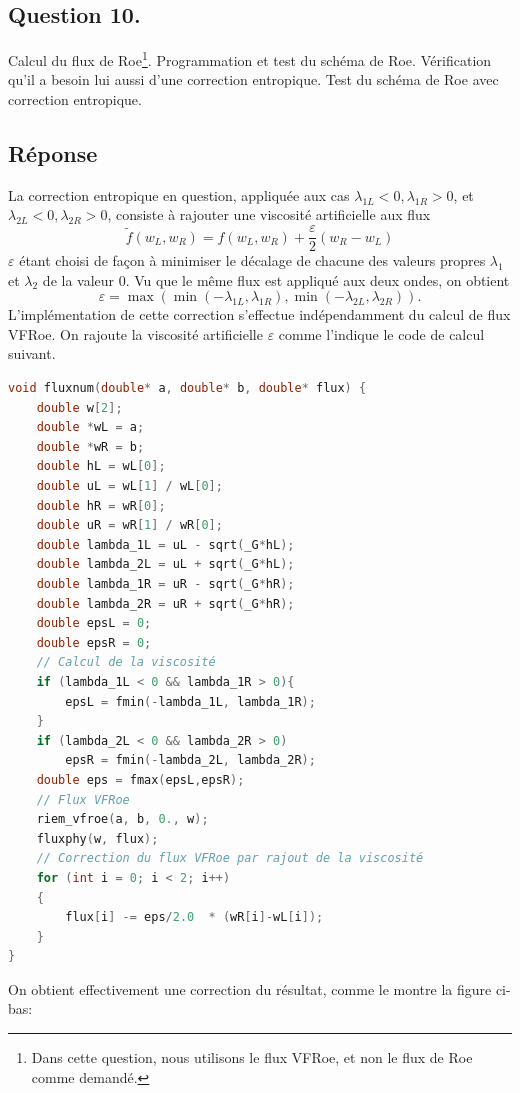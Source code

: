 \documentclass[
	french,
	11pt, %
]{fphw}
\begin{document}
\subsection*{Question 10.}
\begin{problem}
	Calcul du flux de Roe\footnote{Dans cette question, nous utilisons le flux VFRoe, et non le flux de Roe comme demandé.}. Programmation et test du schéma de Roe. Vérification qu'il a besoin lui aussi d'une correction entropique. Test du schéma de Roe avec correction entropique.
\end{problem}

\subsection*{Réponse} 

La correction entropique en question, appliquée aux cas $\lambda_{1L} < 0, \lambda_{1R} > 0$, et $\lambda_{2L} < 0, \lambda_{2R} > 0$, consiste à rajouter une viscosité artificielle aux flux 
$$
\tilde{f}(w_L,w_R) = f(w_L,w_R) + \frac{\varepsilon}{2} (w_R-w_L)
$$
$\varepsilon$ étant choisi de façon à minimiser le décalage de chacune des valeurs propres $\lambda_1$ et $\lambda_2$ de la valeur $0$. Vu que le même flux est appliqué aux deux ondes, on obtient 
$$
\varepsilon = \max{(\min{(-\lambda_{1L}, \lambda_{1R})}, \min{(-\lambda_{2L}, \lambda_{2R})})}.
$$ 
L'implémentation de cette correction s'effectue indépendamment du calcul de flux VFRoe. On rajoute la viscosité artificielle $\varepsilon$ comme l'indique le code de calcul suivant.


\begin{lstlisting}[language=C, caption={Application d'une correction entropique "facile" aux flux VFRoe afin de traiter les points soniques.},breaklines]
void fluxnum(double* a, double* b, double* flux) {
	double w[2];       
	double *wL = a;
	double *wR = b;    
	double hL = wL[0];
	double uL = wL[1] / wL[0];
	double hR = wR[0];
	double uR = wR[1] / wR[0];	
	double lambda_1L = uL - sqrt(_G*hL);
	double lambda_2L = uL + sqrt(_G*hL);
	double lambda_1R = uR - sqrt(_G*hR);
	double lambda_2R = uR + sqrt(_G*hR);
	double epsL = 0;
	double epsR = 0;
	// Calcul de la viscosité
	if (lambda_1L < 0 && lambda_1R > 0){
		epsL = fmin(-lambda_1L, lambda_1R);
	}
	if (lambda_2L < 0 && lambda_2R > 0)
		epsR = fmin(-lambda_2L, lambda_2R);
	double eps = fmax(epsL,epsR);
	// Flux VFRoe
	riem_vfroe(a, b, 0., w);
	fluxphy(w, flux);
	// Correction du flux VFRoe par rajout de la viscosité
	for (int i = 0; i < 2; i++)
	{
		flux[i] -= eps/2.0  * (wR[i]-wL[i]);
	}
}	
\end{lstlisting}
On obtient effectivement une correction du résultat, comme le montre la figure ci-bas:
\end{document}
